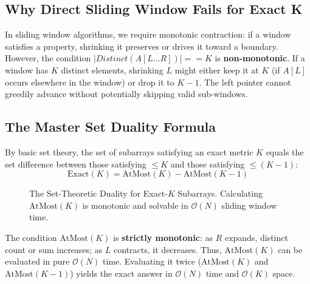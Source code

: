 \documentclass[10pt,journal,compsoc,onecolumn]{IEEEtran}
\begin{document}
\subsection{Why Direct Sliding Window Fails for Exact K}
In sliding window algorithms, we require monotonic contraction: if a window satisfies a property, shrinking it preserves or drives it toward a boundary. However, the condition $|Distinct(A[L \dots R])| == K$ is \textbf{non-monotonic}. If a window has $K$ distinct elements, shrinking $L$ might either keep it at $K$ (if $A[L]$ occurs elsewhere in the window) or drop it to $K-1$. The left pointer cannot greedily advance without potentially skipping valid sub-windows.

\subsection{The Master Set Duality Formula}
By basic set theory, the set of subarrays satisfying an exact metric $K$ equals the set difference between those satisfying $\le K$ and those satisfying $\le (K - 1)$:
\begin{equation}
\text{Exact}(K) = \text{AtMost}(K) - \text{AtMost}(K - 1)
\end{equation}

\begin{figure}[htbp]
\centering
{}
\caption{The Set-Theoretic Duality for Exact-$K$ Subarrays. Calculating $\text{AtMost}(K)$ is monotonic and solvable in $\mathcal{O}(N)$ sliding window time.}
\label{fig:atmost_venn}
\end{figure}

The condition $\text{AtMost}(K)$ is \textbf{strictly monotonic}: as $R$ expands, distinct count or sum increases; as $L$ contracts, it decreases. Thus, $\text{AtMost}(K)$ can be evaluated in pure $\mathcal{O}(N)$ time. Evaluating it twice ($\text{AtMost}(K)$ and $\text{AtMost}(K-1)$) yields the exact answer in $\mathcal{O}(N)$ time and $\mathcal{O}(K)$ space.
\end{document}
